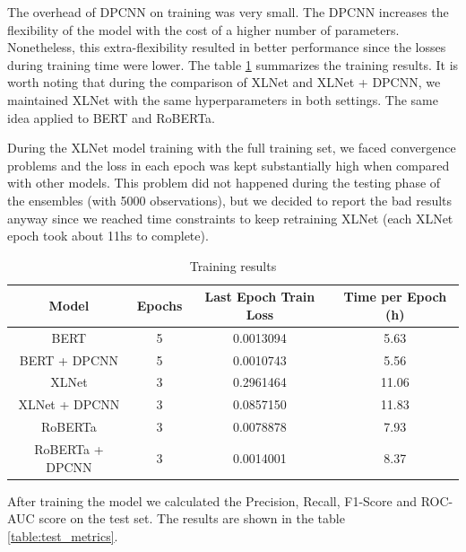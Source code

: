 \documentclass{article}
\begin{document}
The overhead of DPCNN on training was very small. The DPCNN increases the flexibility of the model with the cost of a higher number of parameters. Nonetheless, this extra-flexibility resulted in better performance since the losses during training time were lower. The table \ref{table:training_results} summarizes the training results. It is worth noting that during the comparison of XLNet and XLNet + DPCNN, we maintained XLNet with the same hyperparameters in both settings. The same idea applied to BERT and RoBERTa.

During the XLNet model training with the full training set, we faced convergence problems and the loss in each epoch was kept substantially high when compared with other models. This problem did not happened during the testing phase of the ensembles (with 5000 observations), but we decided to report the bad results anyway since we reached time constraints to keep retraining XLNet (each XLNet epoch took about 11hs to complete). 

\clearpage
\begin{table}
\centering
 \begin{tabular}{ | c | c | c | c |} 
 \hline
 Model & Epochs & Last Epoch Train Loss & Time per Epoch (h) \\
 \hline
 BERT & 5 & 0.0013094 & 5.63 \\
 \hline
 BERT + DPCNN & 5 & 0.0010743 & 5.56 \\
 \hline
 XLNet & 3 & 0.2961464 & 11.06 \\
 \hline
 XLNet + DPCNN & 3 & 0.0857150 & 11.83 \\
 \hline
 RoBERTa & 3 & 0.0078878 & 7.93 \\
 \hline 
 RoBERTa + DPCNN & 3 & 0.0014001 & 8.37 \\
 \hline
\end{tabular}
\caption{Training results}
\label{table:training_results}
\end{table}

After training the model we calculated the Precision, Recall, F1-Score and ROC-AUC score on the test set. The results are shown in the table \ref{table:test_metrics}.
\end{document}
